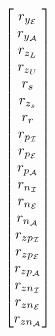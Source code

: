 \documentclass[10pt]{article}
\begin{document}
\begin{equation}
\begin{aligned}
\begin{bmatrix}
		r_{y_{\mathcal E}} \\
		r_{y_{\mathcal A}} \\
		r_{z_L} \\
		r_{z_U} \\
		r_s \\
		r_{z_s} \\
		r_r \\
		r_{p_{\mathcal I}} \\
		r_{p_{\mathcal E}} \\
		r_{p_{\mathcal A}} \\
		r_{n_{\mathcal I}} \\
		r_{n_{\mathcal E}} \\
		r_{n_{\mathcal A}} \\
		r_{zp_{\mathcal I}} \\
		r_{zp_{\mathcal E}} \\
		r_{zp_{\mathcal A}} \\
		r_{zn_{\mathcal I}} \\
		r_{zn_{\mathcal E}} \\
		r_{zn_{\mathcal A}} \\
		\end{bmatrix}
		\end{aligned} \notag
	\end{equation}
	
\end{document}
